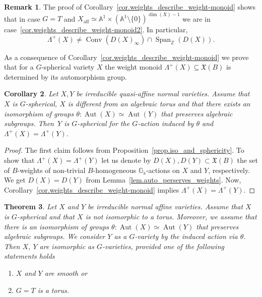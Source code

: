 \documentclass[11pt]{article}
\numberwithin{equation}{section}
\newcommand{\ra}{\mathrm{a}}
\theoremstyle{plain}
\newtheorem{theorem}{Theorem}[section]
\newtheorem{corollary}[theorem]{Corollary}
\theoremstyle{definition}
\newtheorem{remark}[theorem]{Remark}
\DeclareMathOperator{\Aut}{Aut}
\DeclareMathOperator{\aff}{aff}
\DeclareMathOperator{\Conv}{Conv}
\DeclareMathOperator{\Span}{Span}
\newcommand{\GG}{\mathbb{G}}
\newcommand{\ZZ}{\mathbb{Z}}
\renewcommand{\AA}{\mathbb{A}}
\begin{document}
\begin{remark}
\label{rem.special_case}
The proof of Corollary~\ref{cor.weights_describe_weight-monoid} shows that
in case $G = T$ and $X_{\aff} \simeq \AA^1 \times (\AA^1 \setminus \{0\})^{\dim(X)-1}$
we are in case~\ref{cor.weights_describe_weight-monoid2}. In particular,
\[
\Lambda^+(X) \neq \Conv ( D(X)_{\infty}) \cap \Span_{\ZZ}(D(X)).
\]
\end{remark}

As a consequence of Corollary~\ref{cor.weights_describe_weight-monoid} we prove that
for a $G$-spherical variety $X$ the weight monoid $\Lambda^+(X) \subseteq \mathfrak{X}(B)$
is determined by its automorphism group.

\begin{corollary}\label{thesameweights}
\label{cor.Autos_describe_weight_monoids}
Let $X, Y$ be irreducible quasi-affine normal varieties. Assume that~$X$ is $G$-spherical, $X$ is different from an algebraic torus and that
there exists an isomorphism of groups
$\theta \colon \Aut(X) \simeq \Aut(Y)$ that preserves
algebraic subgroups.
Then~$Y$ is $G$-spherical for the $G$-action induced by $\theta$
and $\Lambda^+(X) = \Lambda^+(Y)$.
\end{corollary}

\begin{proof}
The first claim follows from Proposition~\ref{prop.iso_and_sphericity}.
To show that $\Lambda^+(X) = \Lambda^+(Y)$ let us denote by
$D(X), D(Y) \subset \mathfrak{X}(B)$ the set of $B$-weights of non-trivial $B$-homo\-geneous $\GG_\ra$-actions
on $X$ and $Y$, respectively. We get $D(X) = D(Y)$ from Lemma~\ref{lem.auto_perserves_weights}.
Now, Corollary~\ref{cor.weights_describe_weight-monoid} implies $\Lambda^+(X) = \Lambda^+(Y)$.
\end{proof}

\begin{theorem}
\label{thm.smooth_spherical_var}
Let $X$ and $Y$ be irreducible normal affine varieties. Assume that
$X$ is $G$-spherical and that $X$ is not isomorphic
to a torus. Moreover, we assume that there is an isomorphism of groups
$\theta \colon \Aut(X) \simeq \Aut(Y)$ that preserves
algebraic subgroups. We consider $Y$ as a $G$-variety by the induced action via $\theta$. Then
$X$, $Y$ are isomorphic as $G$-varieties, provided one of the following statements holds
\begin{enumerate}\renewcommand{\theenumi}{\alph{enumi}}
\item \label{thm.smooth_spherical_var_cond_a} $X$ and $Y$ are smooth or
\item \label{thm.smooth_spherical_var_cond_b} $G = T$ is a torus.
\end{enumerate}
\end{theorem}
\end{document}

